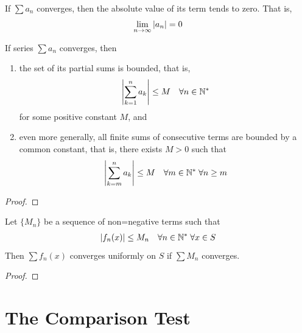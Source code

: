 \documentclass[thmcnt=section, 12pt]{my-elegantbook}
\begin{document}
\begin{corollary} \label{cor:2}
    If $\sum a_n$ converges, then the absolute value of its term tends to zero. That is, 
    \begin{align*}
        \lim_{n \to \infty} \left\lvert a_n \right\rvert = 0
    \end{align*}
\end{corollary}


\begin{theorem} \label{thm:51}
    If series $\sum a_n$ converges, then 
    \begin{enumerate}
        \item the set of its partial sums is bounded, that is, 
        \begin{align*}
            \left\lvert \sum_{k=1}^n a_k \right\rvert \leq M
            \quad \forall n \in \mathbb{N}^\ast
        \end{align*}
        for some positive constant $M$, and
        \item even more generally, all finite sums of consecutive terms are bounded by a common constant, that is, there exists $M > 0$ such that 
        \begin{align*}
            \left\lvert \sum_{k=m}^n a_k \right\rvert \leq M
            \quad \forall m \in \mathbb{N}^\ast \; 
            \forall n \geq m
        \end{align*}
    \end{enumerate}
\end{theorem}

\begin{proof}
\end{proof}


\begin{theorem} \label{thm:56}
    Let $\{M_n\}$ be a sequence of non=negative terms such that 
    \begin{align*}
        \left\lvert f_n(x) \right\rvert \leq M_n
        \quad \forall n \in \mathbb{N}^\ast \; 
        \forall x \in S
    \end{align*}
    Then $\sum f_n(x)$ converges uniformly on $S$ if $\sum M_n$ converges.
\end{theorem}

\begin{proof}
\end{proof}


\section{The Comparison Test}
\end{document}
